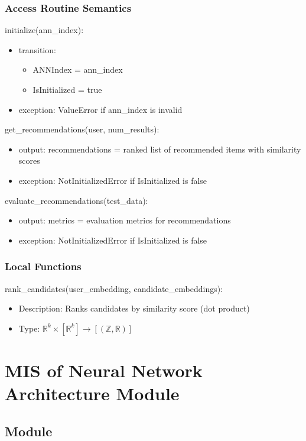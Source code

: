 \documentclass[12pt, titlepage]{article}
\begin{document}
\subsubsection{Access Routine Semantics}

\noindent initialize(ann\_index):
\begin{itemize}
  \item transition:
  \begin{itemize}
    \item ANNIndex = ann\_index
    \item IsInitialized = true
  \end{itemize}
\item exception: ValueError if ann\_index is invalid
\end{itemize}

\noindent get\_recommendations(user, num\_results):
\begin{itemize}
\item output: recommendations = ranked list of recommended items with similarity scores
\item exception: NotInitializedError if IsInitialized is false
\end{itemize}

\noindent evaluate\_recommendations(test\_data):
\begin{itemize}
\item output: metrics = evaluation metrics for recommendations
\item exception: NotInitializedError if IsInitialized is false
\end{itemize}
\subsubsection{Local Functions}
rank\_candidates(user\_embedding, candidate\_embeddings):
\begin{itemize}
  \item Description: Ranks candidates by similarity score (dot product)
  \item Type: $\mathbb{R}^k \times [\mathbb{R}^k] \rightarrow [(\mathbb{Z},\mathbb{R})]$
\end{itemize}

\section{MIS of Neural Network Architecture Module} \label{ModuleNNA}

\subsection{Module}
\end{document}
